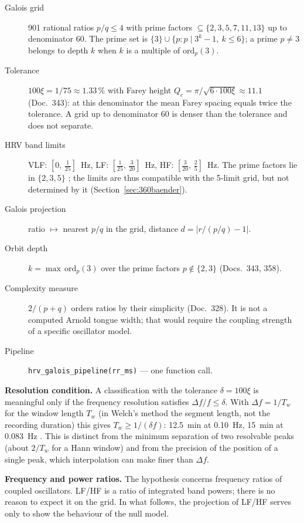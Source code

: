 \begin{description}
\item[Galois grid] 901 rational ratios $p/q\le4$ with prime factors
  $\subseteq\{2,3,5,7,11,13\}$ up to denominator 60. The prime set is
  $\{3\}\cup\{p : p\mid 3^k-1,\ k\le6\}$; a prime $p\neq3$ belongs to
  depth $k$ when $k$ is a multiple of $\mathrm{ord}_p(3)$.
\item[Tolerance] $100\xi = 1/75 \approx 1.33\,\%$ with Farey height
  $Q_c=\pi/\sqrt{6\cdot100\xi}\approx11.1$ (Doc.~343): at this denominator
  the mean Farey spacing equals twice the tolerance. A grid up to
  denominator 60 is denser than the tolerance and does not separate.
\item[HRV band limits] VLF: $[0,\,\tfrac{1}{25}]$~Hz, LF: $[\tfrac{1}{25},\,\tfrac{3}{20}]$~Hz,
  HF: $[\tfrac{3}{20},\,\tfrac{2}{5}]$~Hz. The prime factors lie in
  $\{2,3,5\}$ \BM; the limits are thus compatible with the 5-limit grid,
  but not determined by it (Section~\ref{sec:360baender}).
\item[Galois projection] ratio $\mapsto$ nearest $p/q$ in the grid,
  distance $d=|r/(p/q)-1|$.
\item[Orbit depth] $k=\max\,\mathrm{ord}_p(3)$ over the prime factors
  $p\notin\{2,3\}$ (Docs.~343, 358).
\item[Complexity measure] $2/(p+q)$ orders ratios by their simplicity
  (Doc.~328). It is not a computed Arnold tongue width; that would require
  the coupling strength of a specific oscillator model.
\item[Pipeline] \texttt{hrv\_galois\_pipeline(rr\_ms)} --- one function call.
\end{description}

\textbf{Resolution condition.} A classification with the tolerance
$\delta=100\xi$ is meaningful only if the frequency resolution satisfies
$\Delta f/f\le\delta$. With $\Delta f=1/T_w$ for the window length $T_w$
(in Welch's method the segment length, not the recording duration) this
gives $T_w\ge1/(\delta f)$: 12.5~min at 0.10~Hz, 15~min at 0.083~Hz \BM.
This is distinct from the minimum separation of two resolvable peaks
(about $2/T_w$ for a Hann window) and from the precision of the position
of a single peak, which interpolation can make finer than $\Delta f$.

\textbf{Frequency and power ratios.} The hypothesis concerns frequency
ratios of coupled oscillators. LF/HF is a ratio of integrated band powers;
there is no reason to expect it on the grid. In what follows, the
projection of LF/HF serves only to show the behaviour of the null model.

